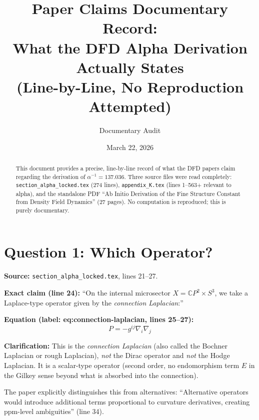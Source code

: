 \documentclass[12pt,a4paper]{article}
\title{Paper Claims Documentary Record:\\[6pt]
\large What the DFD Alpha Derivation Actually States\\
(Line-by-Line, No Reproduction Attempted)}
\author{Documentary Audit}
\date{March 22, 2026}
\begin{document}
\maketitle

\begin{abstract}
This document provides a precise, line-by-line record of what the DFD
papers claim regarding the derivation of $\alpha^{-1} = 137.036$.
Three source files were read completely:
\texttt{section\_alpha\_locked.tex} (274 lines),
\texttt{appendix\_K.tex} (lines 1--563+ relevant to alpha),
and the standalone PDF ``Ab Initio Derivation of the Fine Structure
Constant from Density Field Dynamics'' (27 pages).
No computation is reproduced; this is purely documentary.
\end{abstract}

\tableofcontents
\newpage

\section{Question 1: Which Operator?}
\label{sec:q1}

\begin{tcolorbox}[colback=yellow!5!white, colframe=yellow!50!black,
  title=Answer: CONNECTION LAPLACIAN (scalar-type)]

\textbf{Source:} \texttt{section\_alpha\_locked.tex}, lines 21--27.

\textbf{Exact claim (line 24):}
``On the internal microsector $X = \mathbb{C}P^2 \times S^3$, we take a
Laplace-type operator given by the \emph{connection Laplacian}:''

\textbf{Equation (label: eq:connection-laplacian, lines 25--27):}
\[
  P = -g^{ij}\nabla_i\nabla_j
\]

\textbf{Clarification:} This is the \emph{connection Laplacian}
(also called the Bochner Laplacian or rough Laplacian), \emph{not}
the Dirac operator and \emph{not} the Hodge Laplacian.
It is a scalar-type operator (second order, no endomorphism term $E$
in the Gilkey sense beyond what is absorbed into the connection).

The paper explicitly distinguishes this from alternatives:
``Alternative operators would introduce additional terms proportional
to curvature derivatives, creating ppm-level ambiguities'' (line 34).
\end{tcolorbox}
\end{document}
